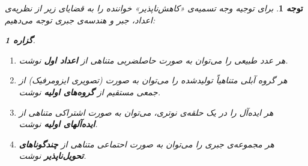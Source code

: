 \documentclass[12pt,a4paper]{report}
\theoremstyle{colorhead}
\newtheorem{prop}[thm]{گزاره}
\newtheorem{tav}[thm]{توجه}
\begin{document}
\begin{tav}
برای توجیه وجه تسمیه‌‌ی «کاهش‌ناپذیر» خواننده را به قضایای زیر از
نظریه‌ی اعداد، 
جبر و هندسه‌ی جبری توجه می‌دهیم:
\begin{prop}
\hfill 
	\begin{enumerate}
	\item 
	هر عدد طبیعی را می‌توان به صورت حاصلضربی متناهی از \textbf{اعداد اول }نوشت. 
	\item 
	هر گروه آبلی متناهیاً تولیدشده را می‌توان به صورت (تصویری ایزومرفیک) از جمعی مستقیم از \textbf{گروه‌های اولیه }نوشت.
\item 
هر ایده‌آل را در یک حلقه‌ی نوتری، می‌توان به صورت اشتراکی متناهی از \textbf{ایده‌آلهای اولیه} نوشت.
\item 
هر مجموعه‌ی جبری را می‌توان به صورت احتماعی  متناهی از \textbf{چندگوناهای تحویل‌ناپذیر} نوشت. 
\end{enumerate}
	\end{prop}
	\end{tav}
\end{document}
